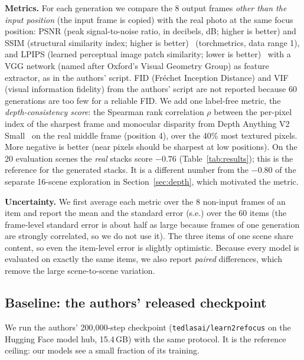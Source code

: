 \documentclass[11pt]{article}
\begin{document}
\textbf{Metrics.} For each generation we compare the 8 output frames \emph{other than the input position} (the input frame is copied) with the real photo at the same focus position: PSNR (peak signal-to-noise ratio, in decibels, dB; higher is better) and SSIM (structural similarity index; higher is better)~\cite{wang2004ssim} (torchmetrics, data range 1), and LPIPS (learned perceptual image patch similarity; lower is better)~\cite{zhang2018lpips} with a VGG network (named after Oxford's Visual Geometry Group) as feature extractor, as in the authors' script. FID (Fr\'echet Inception Distance) and VIF (visual information fidelity) from the authors' script are not reported because 60 generations are too few for a reliable FID.
We add one label-free metric, the \emph{depth-consistency score}: the Spearman rank correlation $\rho$ between the per-pixel index of the sharpest frame and monocular disparity from Depth Anything V2 Small~\cite{yang2024depthanythingv2} on the real middle frame (position 4), over the 40\% most textured pixels. More negative is better (near pixels should be sharpest at low positions). On the 20 evaluation scenes the \emph{real} stacks score $-0.76$ (Table~\ref{tab:results}); this is the reference for the generated stacks. It is a different number from the $-0.80$ of the separate 16-scene exploration in Section~\ref{sec:depth}, which motivated the metric.

\textbf{Uncertainty.} We first average each metric over the 8 non-input frames of an item and report the mean and the standard error (s.e.) over the 60 items (the frame-level standard error is about half as large because frames of one generation are strongly correlated, so we do not use it). The three items of one scene share content, so even the item-level error is slightly optimistic. Because every model is evaluated on exactly the same items, we also report \emph{paired} differences, which remove the large scene-to-scene variation.

\subsection{Baseline: the authors' released checkpoint}
We run the authors' 200{,}000-step checkpoint (\texttt{tedlasai/learn2refocus} on the Hugging Face model hub, 15.4\,GB) with the same protocol. It is the reference ceiling: our models see a small fraction of its training.
\end{document}
